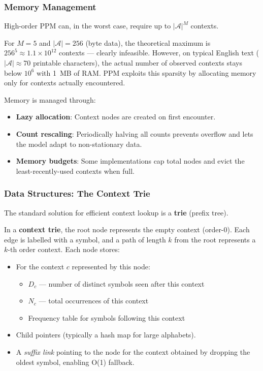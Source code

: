 \subsubsection{Memory Management}

High-order PPM can, in the worst case, require up to $|\mathcal{A}|^M$ contexts.

\begin{examplebox}
For $M = 5$ and $|\mathcal{A}| = 256$ (byte data), the theoretical maximum is
$256^5 \approx 1.1 \times 10^{12}$ contexts --- clearly infeasible. However, on
typical English text ($|\mathcal{A}| \approx 70$ printable characters), the actual
number of observed contexts stays below $10^6$ with 1~MB of RAM. PPM exploits this
sparsity by allocating memory only for contexts actually encountered.
\end{examplebox}

Memory is managed through:
\begin{itemize}
    \item \textbf{Lazy allocation}: Context nodes are created on first encounter.
    \item \textbf{Count rescaling}: Periodically halving all counts prevents overflow
          and lets the model adapt to non-stationary data.
    \item \textbf{Memory budgets}: Some implementations cap total nodes and evict the
          least-recently-used contexts when full.
\end{itemize}

\subsubsection{Data Structures: The Context Trie}

The standard solution for efficient context lookup is a \textbf{trie} (prefix tree).

\begin{definitionbox}
In a \textbf{context trie}, the root node represents the empty context (order-0).
Each edge is labelled with a symbol, and a path of length $k$ from the root
represents a $k$-th order context. Each node stores:
\begin{itemize}
    \item For the context $c$ represented by this node:
        \begin{itemize}
            \item $D_c$ — number of distinct symbols seen after this context
            \item $N_c$ — total occurrences of this context
            \item Frequency table for symbols following this context
        \end{itemize}
    \item Child pointers (typically a hash map for large alphabets).
    \item A \emph{suffix link} pointing to the node for the context obtained by
          dropping the oldest symbol, enabling O(1) fallback.
\end{itemize}
\end{definitionbox}


